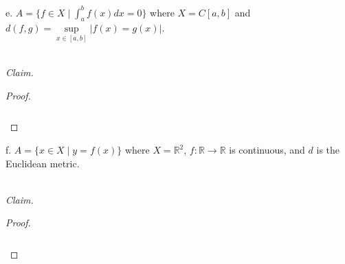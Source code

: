 \pagebreak

e.  $A = \{ f \in X \mid \int_a^b{f(x) dx} = 0 \}$ where $X = C[a, b]$ and 
    $d(f, g) = \sup\limits_{x \in [a, b]}{|f(x) = g(x)|}$. 

\ \\
\emph{Claim.} 

\begin{proof}\renewcommand{\qedsymbol}{}\ \\\\
    \begin{align*}
    \end{align*}
\end{proof}

\pagebreak

f.  $A = \{ x \in X \mid y = f(x) \}$ where $X = \mathbb{R}^2$, $f:\mathbb{R} \to \mathbb{R}$ is continuous, and $d$ is 
    the Euclidean metric.

\ \\
\emph{Claim.} 

\begin{proof}\renewcommand{\qedsymbol}{}\ \\\\
    \begin{align*}
    \end{align*}
\end{proof}

\pagebreak